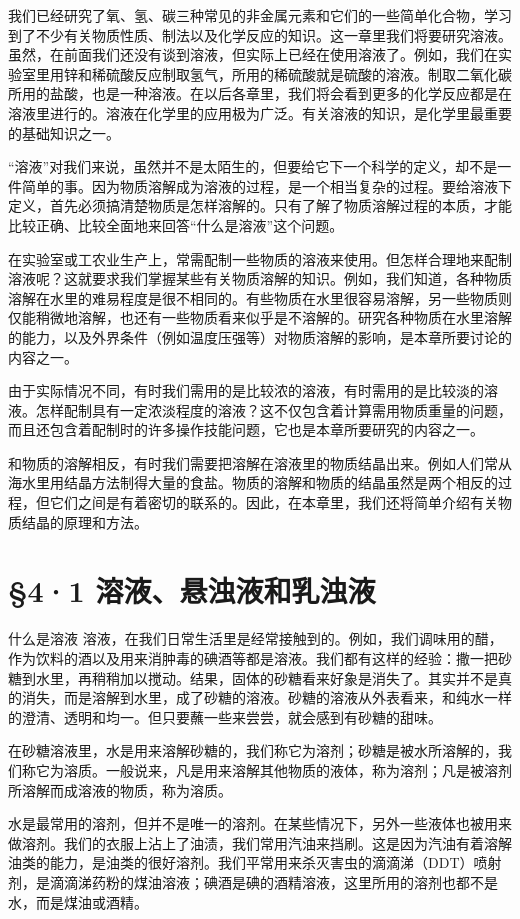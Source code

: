 我们已经研究了氧、氢、碳三种常见的非金属元素和它们的一些简单化合物，学习到了不少有关物质性质、制法以及化学反应的知识。这一章里我们将要研究溶液。虽然，在前面我们还没有谈到溶液，但实际上已经在使用溶液了。例如，我们在实验室里用锌和稀硫酸反应制取氢气，所用的稀硫酸就是硫酸的溶液。制取二氧化碳所用的盐酸，也是一种溶液。在以后各章里，我们将会看到更多的化学反应都是在溶液里进行的。溶液在化学里的应用极为广泛。有关溶液的知识，是化学里最重要的基础知识之一。

``溶液''对我们来说，虽然并不是太陌生的，但要给它下一个科学的定义，却不是一件简单的事。因为物质溶解成为溶液的过程，是一个相当复杂的过程。要给溶液下定义，首先必须搞清楚物质是怎样溶解的。只有了解了物质溶解过程的本质，才能比较正确、比较全面地来回答``什么是溶液''这个问题。

在实验室或工农业生产上，常需配制一些物质的溶液来使用。但怎样合理地来配制溶液呢？这就要求我们掌握某些有关物质溶解的知识。例如，我们知道，各种物质溶解在水里的难易程度是很不相同的。有些物质在水里很容易溶解，另一些物质则仅能稍微地溶解，也还有一些物质看来似乎是不溶解的。研究各种物质在水里溶解的能力，以及外界条件（例如温度压强等）对物质溶解的影响，是本章所要讨论的内容之一。

由于实际情况不同，有时我们需用的是比较浓的溶液，有时需用的是比较淡的溶液。怎样配制具有一定浓淡程度的溶液？这不仅包含着计算需用物质重量的问题，而且还包含着配制时的许多操作技能问题，它也是本章所要研究的内容之一。

和物质的溶解相反，有时我们需要把溶解在溶液里的物质结晶出来。例如人们常从海水里用结晶方法制得大量的食盐。物质的溶解和物质的结晶虽然是两个相反的过程，但它们之间是有着密切的联系的。因此，在本章里，我们还将简单介绍有关物质结晶的原理和方法。

\section{§4·1 溶液、悬浊液和乳浊液}

什么是溶液
溶液，在我们日常生活里是经常接触到的。例如，我们调味用的醋，作为饮料的酒以及用来消肿毒的碘酒等都是溶液。我们都有这样的经验：撒一把砂糖到水里，再稍稍加以搅动。结果，固体的砂糖看来好象是消失了。其实并不是真的消失，而是溶解到水里，成了砂糖的溶液。砂糖的溶液从外表看来，和纯水一样的澄清、透明和均一。但只要蘸一些来尝尝，就会感到有砂糖的甜味。

在砂糖溶液里，水是用来溶解砂糖的，我们称它为溶剂；砂糖是被水所溶解的，我们称它为溶质。一般说来，凡是用来溶解其他物质的液体，称为溶剂；凡是被溶剂所溶解而成溶液的物质，称为溶质。

水是最常用的溶剂，但并不是唯一的溶剂。在某些情况下，另外一些液体也被用来做溶剂。我们的衣服上沾上了油渍，我们常用汽油来挡刷。这是因为汽油有着溶解油类的能力，是油类的很好溶剂。我们平常用来杀灭害虫的滴滴涕（DDT）喷射剂，是滴滴涕药粉的煤油溶液；碘酒是碘的酒精溶液，这里所用的溶剂也都不是水，而是煤油或酒精。

